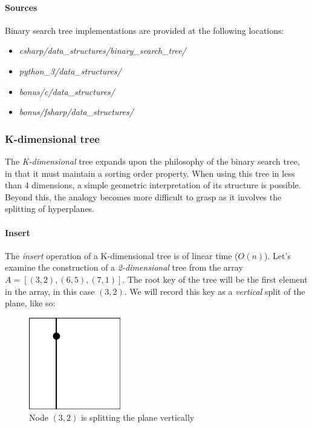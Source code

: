 \documentclass{article}
\begin{document}
\begin{samepage}
  \paragraph{Sources}
  Binary search tree implementations are provided at the following locations:
  \begin{itemize}
  \item{{\em csharp/data\_structures/binary\_search\_tree/}}
  \item{{\em python\_3/data\_structures/}}
  \item{{\em bonus/c/data\_structures/}}
  \item{{\em bonus/fsharp/data\_structures/}}
  \end{itemize}
\end{samepage}

\subsubsection{K-dimensional tree}
The {\em K-dimensional} tree expands upon the philosophy of the binary search tree, in that it
must maintain a sorting order property. When using this tree in less than 4 dimensions,
a simple geometric interpretation of its structure is possible. Beyond this, the analogy becomes
more difficult to grasp as it involves the splitting of hyperplanes.

\paragraph{Insert}
The {\em insert} operation of a K-dimensional tree is of linear time (\(O(n)\)).
Let's examine the construction of a {\em 2-dimensional} tree from the array \(A = [(3, 2), (6, 5), (7, 1)]\).
The root key of the tree will be the first element in the array, in this case \((3, 2)\).
We will record this key as a {\em vertical} split of the plane, like so:

\begin{figure}[H]
  \centering
  \includegraphics[width=4cm]{2d_tree_0}
  \caption{Node \((3, 2)\) is splitting the plane vertically}
\end{figure}
\end{document}
